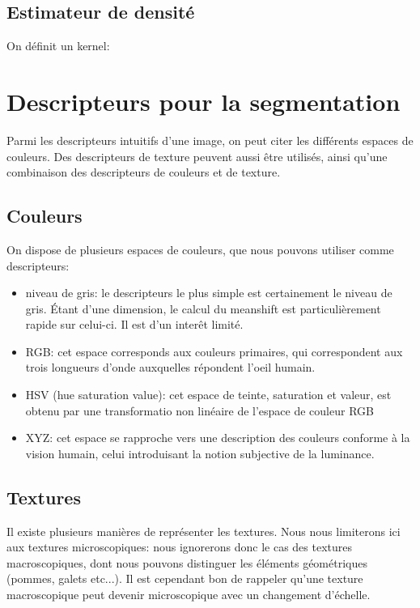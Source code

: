 \documentclass{article}
\begin{document}
\subsection{Estimateur de densité}
On définit un kernel:

\section{Descripteurs pour la segmentation}

Parmi les descripteurs intuitifs d'une image, on peut citer les différents
espaces de couleurs. Des descripteurs de texture peuvent aussi être utilisés,
ainsi qu'une combinaison des descripteurs de couleurs et de texture.

\subsection{Couleurs}

On dispose de plusieurs espaces de couleurs, que nous pouvons utiliser comme
descripteurs:

\begin{itemize}
\item niveau de gris: le descripteurs le plus simple est certainement le
niveau de gris. Étant d'une dimension, le calcul du meanshift est
particulièrement rapide sur celui-ci. Il est d'un interêt limité.
\item RGB: cet espace corresponds aux couleurs primaires, qui correspondent
aux trois longueurs d'onde auxquelles répondent l'oeil humain.
\item HSV (hue saturation value): cet espace de teinte, saturation et valeur,
est obtenu par une transformatio non linéaire de l'espace de couleur RGB
\item XYZ: cet espace se rapproche vers une description des couleurs conforme
à la vision humain, celui introduisant la notion subjective de la luminance.
\end{itemize}

\subsection{Textures}

Il existe plusieurs manières de représenter les textures. Nous nous limiterons
ici aux textures microscopiques: nous ignorerons donc le cas des textures
macroscopiques, dont nous pouvons distinguer les éléments géométriques
(pommes, galets etc...). Il est cependant bon de rappeler qu'une texture
macroscopique peut devenir microscopique avec un changement d'échelle.
\end{document}
